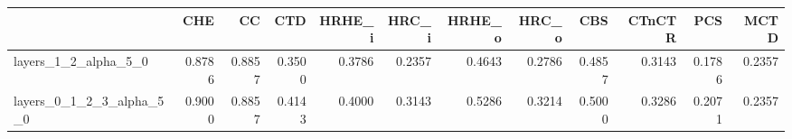 \begin{tabular}{lrrrrrrrrrrr}
\toprule
 & CHE & CC & CTD & HRHE_i & HRC_i & HRHE_o & HRC_o & CBS & CTnCTR & PCS & MCTD \\
\midrule
layers_1_2_alpha_5_0 & 0.8786 & 0.8857 & 0.3500 & 0.3786 & 0.2357 & 0.4643 & 0.2786 & 0.4857 & 0.3143 & 0.1786 & 0.2357 \\
layers_0_1_2_3_alpha_5_0 & 0.9000 & 0.8857 & 0.4143 & 0.4000 & 0.3143 & 0.5286 & 0.3214 & 0.5000 & 0.3286 & 0.2071 & 0.2357 \\
\bottomrule
\end{tabular}
